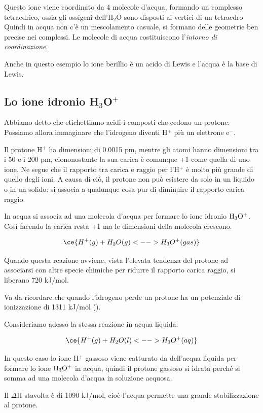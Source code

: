 Questo ione viene coordinato da 4 molecole d'acqua, formando un complesso tetraedrico, ossia gli ossigeni dell'H$_2$O sono disposti ai vertici di un tetraedro Quindi in acqua non c'è un mescolamento casuale, si formano delle geometrie ben precise nei complessi. Le molecole di acqua costituiscono l'\textit{intorno di coordinazione}.

Anche in questo esempio lo ione berillio è un acido di Lewis e l'acqua è la base di Lewis.

\subsection{Lo ione idronio H$_3$O$^+$}
Abbiamo detto che etichettiamo acidi i composti che cedono un protone. Possiamo allora immaginare che l'idrogeno diventi H$^+$ più un elettrone e$^-$.

Il protone H$^+$ ha dimensioni di 0.0015 pm, mentre gli atomi hanno dimensioni tra i 50 e i 200 pm, ciononostante la sua carica è comunque +1 come quella di uno ione. Ne segue che il rapporto tra carica e raggio per l'H$^+$ è molto più grande di quello degli ioni. A causa di ciò, il protone non può esistere da solo in un liquido o in un solido: si associa a qualunque cosa pur di diminuire il rapporto carica raggio.

In acqua si associa ad una molecola d'acqua per formare lo ione idronio $\rm H_3O^+$. Così facendo la carica resta +1 ma le dimensioni della molecola crescono.

$$\ce{H^+(g) + H_2O(g) <--> H_3O^+(gas)}$$

Quando questa reazione avviene, vista l'elevata tendenza del protone ad associarsi con altre specie chimiche per ridurre il rapporto carica raggio, si liberano 720 kJ/mol.

Va da ricordare che quando l'idrogeno perde un protone ha un potenziale di ionizzazione di 1311 kJ/mol ().

\vspace{0.2cm}Consideriamo adesso la stessa reazione in acqua liquida:

$$\ce{H^+(g) + H_2O(l) <--> H_3O^+(aq)}$$

In questo caso lo ione H$^+$ gassoso viene catturato da dell'acqua liquida per formare lo ione $\rm H_3O^+$ in acqua, quindi il protone gassoso si idrata perché si somma ad una molecola d'acqua in soluzione acquosa.

Il $\Delta$H stavolta è di 1090 kJ/mol, cioè l'acqua permette una grande stabilizzazione al protone.

